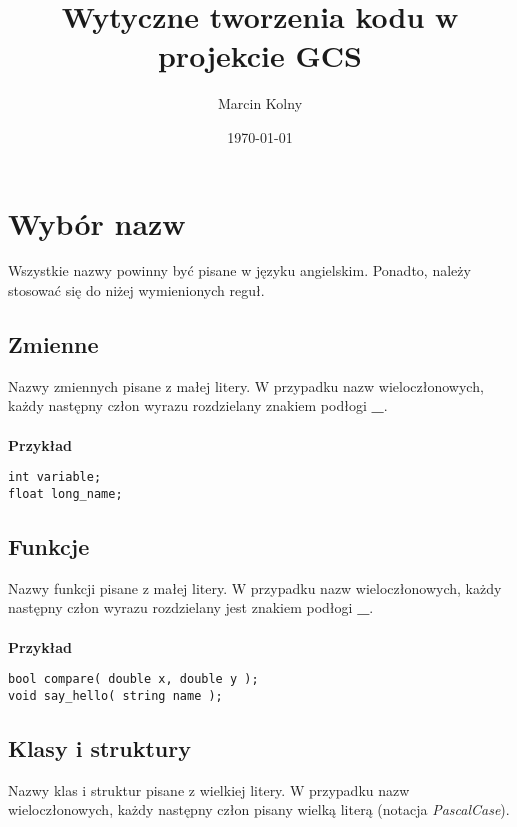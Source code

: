 \documentclass[titlepage]{article}
\title{Wytyczne tworzenia kodu w projekcie GCS}
\author{Marcin Kolny\\
\authoremail}
\date{\today}
\begin{document}
\pagestyle{plain}
\maketitle

\tableofcontents
\cleardoublepage
\section{Wybór nazw}
Wszystkie nazwy powinny być pisane w języku angielskim. Ponadto, należy stosować się do niżej wymienionych reguł.
\subsection{Zmienne}
Nazwy zmiennych pisane z małej litery. W przypadku nazw wieloczłonowych, każdy następny człon wyrazu rozdzielany znakiem podłogi \textbf{\_}.
\paragraph{}
\textbf{Przykład}
\begin{lstlisting}
int variable;
float long_name;
\end{lstlisting}
\subsection{Funkcje}
Nazwy funkcji pisane z małej litery. W przypadku nazw wieloczłonowych, każdy następny człon wyrazu rozdzielany jest znakiem podłogi \textbf{\_}.
\paragraph{}
\textbf{Przykład}
\begin{lstlisting}
bool compare( double x, double y );
void say_hello( string name );
\end{lstlisting}
\subsection{Klasy i struktury}
Nazwy klas i struktur pisane z wielkiej litery. W przypadku nazw wieloczłonowych, każdy następny człon pisany wielką literą (notacja \textit{PascalCase}).
\end{document}
